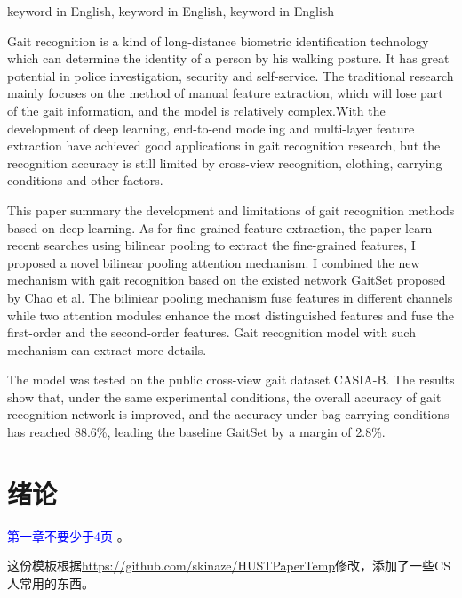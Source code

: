 \documentclass[supercite]{HustGraduPaper}
\theoremstyle{definition}
\begin{document}
\begin{enabstract}{keyword in English, keyword in English, keyword in English}

Gait recognition is a kind of long-distance biometric identification technology which can determine the identity of a person by his walking posture. It has great potential in police investigation, security and self-service. The traditional research mainly focuses on the method of manual feature extraction, which will lose part of the gait information, and the model is relatively complex.With the development of deep learning, end-to-end modeling and multi-layer feature extraction have achieved good applications in gait recognition research, but the recognition accuracy is still limited by cross-view recognition, clothing, carrying conditions and other factors.

This paper summary the development and limitations of gait recognition methods based on deep learning. As for fine-grained feature extraction, the paper learn recent searches using bilinear pooling to extract the fine-grained features, I proposed a novel bilinear pooling attention mechanism. I combined the new mechanism with gait recognition based on the existed network GaitSet proposed by Chao et al. The biliniear pooling mechanism fuse features in different channels while two attention modules enhance the most distinguished features and fuse the first-order and the second-order features. Gait recognition model with such mechanism can extract more details.

The model was tested on the public cross-view gait dataset CASIA-B. The results show that, under the same experimental conditions, the overall accuracy of gait recognition network is improved, and the accuracy under bag-carrying conditions has reached 88.6\%, leading the baseline GaitSet by a margin of 2.8\%.


\end{enabstract}

\tableofcontents[level=2]
\clearpage


\section{绪论}

\textcolor{blue}{第一章不要少于4页\cite{hww}}	。

这份模板根据\url{https://github.com/skinaze/HUSTPaperTemp}\cite{ski17}修改，添加了一些CS人常用的东西\cite{baf96}。
\end{document}
